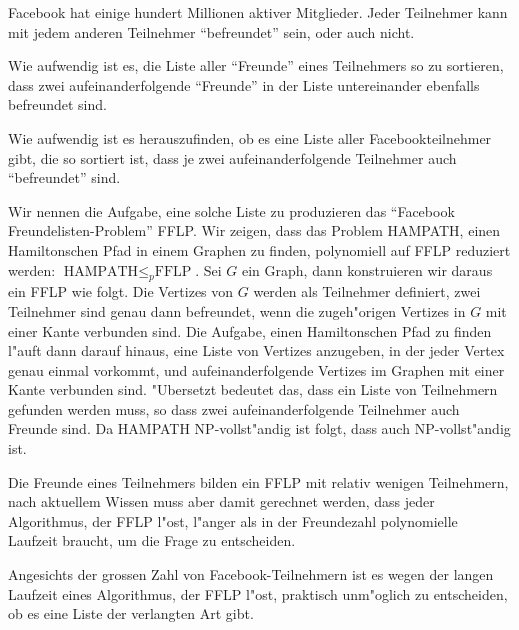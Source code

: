 Facebook hat einige hundert Millionen aktiver Mitglieder.
Jeder Teilnehmer kann mit jedem anderen Teilnehmer ``befreundet''
sein, oder auch nicht.
\begin{teilaufgaben}
\item
Wie aufwendig ist es, die Liste aller ``Freunde''
eines Teilnehmers so zu sortieren, dass zwei aufeinanderfolgende ``Freunde''
in der Liste untereinander ebenfalls befreundet sind.
\item
Wie aufwendig
ist es herauszufinden, ob es eine Liste aller Facebookteilnehmer gibt,
die so sortiert ist, dass je zwei aufeinanderfolgende Teilnehmer
auch ``befreundet'' sind.
\end{teilaufgaben}

\begin{loesung}
Wir nennen die Aufgabe, eine solche Liste zu produzieren das ``Facebook
Freundelisten-Problem'' FFLP. Wir zeigen, dass das Problem
HAMPATH, einen Hamiltonschen Pfad in einem Graphen zu finden,
polynomiell auf FFLP reduziert werden:
$\text{HAMPATH}\le_p\text{FFLP}$.
Sei $G$ ein Graph, dann konstruieren wir daraus ein FFLP wie
folgt. Die Vertizes von $G$ werden als Teilnehmer definiert,
zwei Teilnehmer sind genau dann befreundet, wenn die zugeh"origen
Vertizes in $G$ mit einer Kante verbunden sind. Die Aufgabe, einen
Hamiltonschen Pfad zu finden l"auft dann darauf hinaus, eine Liste
von Vertizes anzugeben, in der jeder Vertex genau einmal vorkommt,
und aufeinanderfolgende Vertizes im Graphen mit einer Kante verbunden
sind. "Ubersetzt bedeutet das, dass ein Liste von Teilnehmern gefunden
werden muss, so dass zwei aufeinanderfolgende Teilnehmer auch Freunde sind.
Da HAMPATH NP-vollst"andig ist folgt, dass auch  NP-vollst"andig
ist.
\begin{teilaufgaben}
\item Die Freunde eines Teilnehmers bilden ein FFLP mit relativ wenigen
Teilnehmern, nach aktuellem Wissen muss aber damit gerechnet werden,
dass jeder Algorithmus, der FFLP l"ost, l"anger als in der Freundezahl
polynomielle Laufzeit braucht, um die Frage zu entscheiden.
\item Angesichts der grossen Zahl von Facebook-Teilnehmern ist es
wegen der langen Laufzeit eines Algorithmus, der FFLP l"ost,
praktisch unm"oglich zu entscheiden, ob es eine Liste der verlangten
Art gibt.
\end{teilaufgaben}
\end{loesung}
